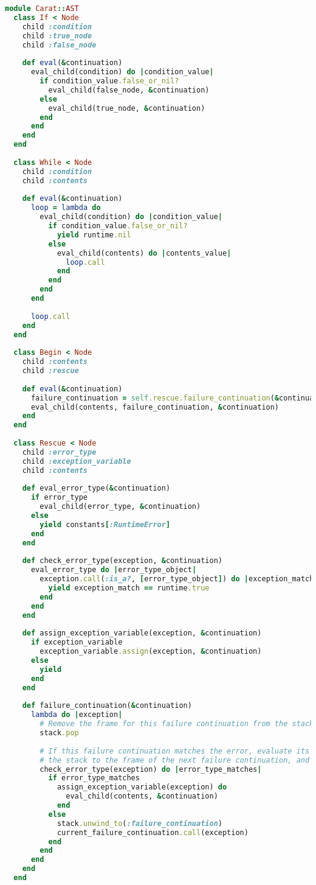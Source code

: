 \begin{lstlisting}[title={\small\Helvetica ast/control.rb},language=Ruby]
module Carat::AST
  class If < Node
    child :condition
    child :true_node
    child :false_node
    
    def eval(&continuation)
      eval_child(condition) do |condition_value|
        if condition_value.false_or_nil?
          eval_child(false_node, &continuation)
        else
          eval_child(true_node, &continuation)
        end
      end
    end
  end
  
  class While < Node
    child :condition
    child :contents
    
    def eval(&continuation)
      loop = lambda do
        eval_child(condition) do |condition_value|
          if condition_value.false_or_nil?
            yield runtime.nil
          else
            eval_child(contents) do |contents_value|
              loop.call
            end
          end
        end
      end
      
      loop.call
    end
  end
  
  class Begin < Node
    child :contents
    child :rescue
    
    def eval(&continuation)
      failure_continuation = self.rescue.failure_continuation(&continuation) if self.rescue
      eval_child(contents, failure_continuation, &continuation)
    end
  end
  
  class Rescue < Node
    child :error_type
    child :exception_variable
    child :contents
    
    def eval_error_type(&continuation)
      if error_type
        eval_child(error_type, &continuation)
      else
        yield constants[:RuntimeError]
      end
    end
    
    def check_error_type(exception, &continuation)
      eval_error_type do |error_type_object|
        exception.call(:is_a?, [error_type_object]) do |exception_match|
          yield exception_match == runtime.true
        end
      end
    end
    
    def assign_exception_variable(exception, &continuation)
      if exception_variable
        exception_variable.assign(exception, &continuation)
      else
        yield
      end
    end
    
    def failure_continuation(&continuation)
      lambda do |exception|
        # Remove the frame for this failure continuation from the stack
        stack.pop
        
        # If this failure continuation matches the error, evaluate its contents. Otherwise, unwind
        # the stack to the frame of the next failure continuation, and call that.
        check_error_type(exception) do |error_type_matches|
          if error_type_matches
            assign_exception_variable(exception) do
              eval_child(contents, &continuation)
            end
          else
            stack.unwind_to(:failure_continuation)
            current_failure_continuation.call(exception)
          end
        end
      end
    end
  end
  

\end{lstlisting}
